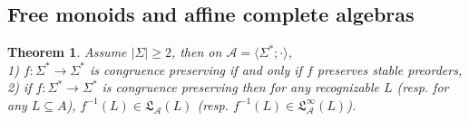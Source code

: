 \documentclass[11pt,a4paper]{article}
\newtheorem{theorem}{Theorem}[section]
\theoremstyle{definition} %
\newcommand\+[1]{\mathcal{#1}} %
\newcommand{\Latt}{{\mathfrak{L}}}
\newcommand{\pat}{\color{red}}
\begin{document}
\subsection{Free monoids and  affine complete algebras}\label{ss affine complete}%

%
\begin{theorem}\label{th:freeMLat} Assume $|\Sigma|\geq 2$, then on $\+A=\langle \Sigma^*; \cdot \rangle$,\\
1) $f\colon \Sigma^*\to \Sigma^*$ is congruence preserving  if and only if  $f$ preserves stable preorders, \\
 2) if $f\colon \Sigma^*\to \Sigma^*$ is congruence preserving then for any recognizable  $L$ (resp. for  any $L\subseteq A$),  $f^{-1}(L)\in \Latt_{\+A}(L)$ (resp.   $f^{-1}(L)\in\Latt_{\+A}^\infty(L)$).
\end{theorem}
\end{document}
